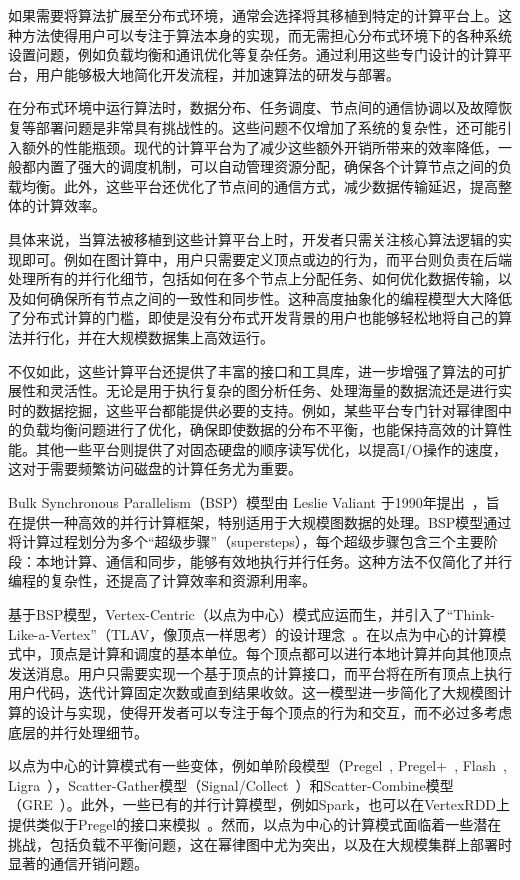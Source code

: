 如果需要将算法扩展至分布式环境，通常会选择将其移植到特定的计算平台上。这种方法使得用户可以专注于算法本身的实现，而无需担心分布式环境下的各种系统设置问题，例如负载均衡和通讯优化等复杂任务。通过利用这些专门设计的计算平台，用户能够极大地简化开发流程，并加速算法的研发与部署。

在分布式环境中运行算法时，数据分布、任务调度、节点间的通信协调以及故障恢复等部署问题是非常具有挑战性的。这些问题不仅增加了系统的复杂性，还可能引入额外的性能瓶颈。现代的计算平台为了减少这些额外开销所带来的效率降低，一般都内置了强大的调度机制，可以自动管理资源分配，确保各个计算节点之间的负载均衡。此外，这些平台还优化了节点间的通信方式，减少数据传输延迟，提高整体的计算效率。

具体来说，当算法被移植到这些计算平台上时，开发者只需关注核心算法逻辑的实现即可。例如在图计算中，用户只需要定义顶点或边的行为，而平台则负责在后端处理所有的并行化细节，包括如何在多个节点上分配任务、如何优化数据传输，以及如何确保所有节点之间的一致性和同步性。这种高度抽象化的编程模型大大降低了分布式计算的门槛，即使是没有分布式开发背景的用户也能够轻松地将自己的算法并行化，并在大规模数据集上高效运行。

不仅如此，这些计算平台还提供了丰富的接口和工具库，进一步增强了算法的可扩展性和灵活性。无论是用于执行复杂的图分析任务、处理海量的数据流还是进行实时的数据挖掘，这些平台都能提供必要的支持。例如，某些平台专门针对幂律图中的负载均衡问题进行了优化，确保即使数据的分布不平衡，也能保持高效的计算性能。其他一些平台则提供了对固态硬盘的顺序读写优化，以提高I/O操作的速度，这对于需要频繁访问磁盘的计算任务尤为重要。

Bulk Synchronous Parallelism（BSP）模型由 Leslie Valiant 于1990年提出~\cite{valiant1990bridging}，旨在提供一种高效的并行计算框架，特别适用于大规模图数据的处理。BSP模型通过将计算过程划分为多个“超级步骤”（supersteps），每个超级步骤包含三个主要阶段：本地计算、通信和同步，能够有效地执行并行任务。这种方法不仅简化了并行编程的复杂性，还提高了计算效率和资源利用率。

基于BSP模型，Vertex-Centric（以点为中心）模式应运而生，并引入了“Think-Like-a-Vertex”（TLAV，像顶点一样思考）的设计理念~\cite{mccune2015thinking}。在以点为中心的计算模式中，顶点是计算和调度的基本单位。每个顶点都可以进行本地计算并向其他顶点发送消息。用户只需要实现一个基于顶点的计算接口，而平台将在所有顶点上执行用户代码，迭代计算固定次数或直到结果收敛。这一模型进一步简化了大规模图计算的设计与实现，使得开发者可以专注于每个顶点的行为和交互，而不必过多考虑底层的并行处理细节。

以点为中心的计算模式有一些变体，例如单阶段模型（Pregel~\cite{malewicz2010pregel}, Pregel+~\cite{yan2015effective}, Flash~\cite{10184838}, Ligra~\cite{DBLP:conf/ppopp/ShunB13}），Scatter-Gather模型（Signal/Collect~\cite{stutz2010signal}）和Scatter-Combine模型（GRE~\cite{yan2014pregel}）。此外，一些已有的并行计算模型，例如Spark，也可以在VertexRDD上提供类似于Pregel的接口来模拟~\cite{gonzalez2014graphx}。然而，以点为中心的计算模式面临着一些潜在挑战，包括负载不平衡问题，这在幂律图中尤为突出，以及在大规模集群上部署时显著的通信开销问题。

